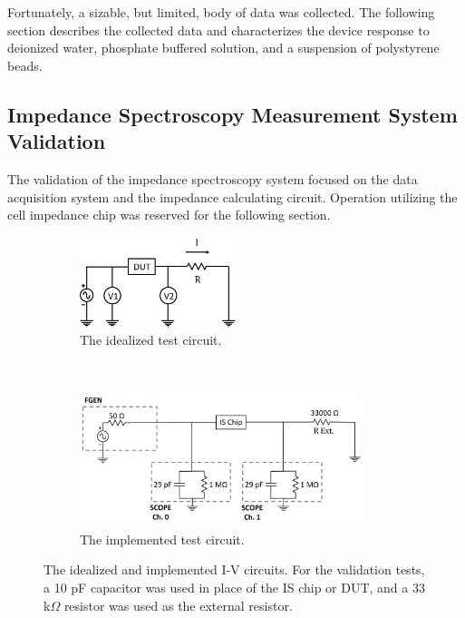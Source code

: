 \par Fortunately, a sizable, but limited, body of data was collected. The following section describes the collected data and characterizes the device response to deionized water, phosphate buffered solution, and a suspension of polystyrene beads.

\FloatBarrier

\subsection{Impedance Spectroscopy Measurement System Validation}

\par The validation of the impedance spectroscopy system focused on the data acquisition system and the impedance calculating circuit. Operation utilizing the cell impedance chip was reserved for the following section.

\begin{figure}[h]
\centering
    \begin{subfigure}[b]{\textwidth}
        \centering
        \includegraphics[width=0.5\textwidth]{images/I-VMethod.png}
        \caption{The idealized test circuit.}
    \end{subfigure}
    \\
    \vspace{0.1 in}
    \begin{subfigure}[b]{\textwidth}
        \centering
        \includegraphics[width=0.9\textwidth]{images/method_I-V.png}
        \caption{The implemented test circuit.}
    \end{subfigure}
    \caption{The idealized and implemented I-V circuits. For the validation tests, a 10 pF capacitor was used in place of the IS chip or DUT, and a 33 k$\Omega$ resistor was used as the external resistor.}
    \label{fig:IS_DAQ_test_circuit}
\end{figure}

